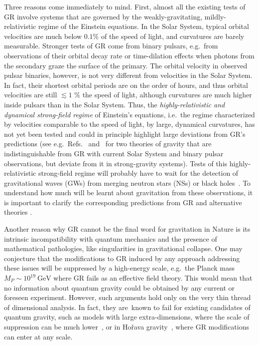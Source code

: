 \documentclass[prd,aps,twocolumn,nofootinbib,showpacs,superscriptaddress]{revtex4-1}
\begin{document}
Three reasons come immediately to mind. First, almost all the existing tests of GR involve systems that are governed by the
weakly-gravitating, mildly-relativistic regime of the Einstein
equations. In the Solar System, typical orbital velocities are much below $0.1\%$ of the speed of light, and curvatures
are barely measurable. Stronger tests of GR come from
binary pulsars, e.g.~from observations
of their orbital decay rate or time-dilation effects when photons from
the secondary graze the surface of the primary. The
orbital velocity in observed pulsar binaries, however, is not very different
from velocities in the Solar System. In fact, their shortest orbital periods
are on the order of hours, and thus orbital velocities are still $\lesssim 1$ \% the speed of light, 
although curvatures are much higher inside pulsars than in the Solar System. 
Thus, the {\textit{highly-relativistic and dynamical strong-field regime}} of Einstein's equations,
i.e.~the regime characterized by velocities comparable to
the speed of light, by large, dynamical curvatures,  
has not yet been tested and could in principle highlight large deviations 
from GR's predictions (see e.g.~Refs.~\cite{ST0,ST1,ST2,ST3} and~\cite{CSreview,Yagi:2011xp,Yagi:2012vf,Yagi:2013mbt} for two theories of gravity that are indistinguishable from GR with current Solar System and binary pulsar observations, but
deviate from it in strong-gravity systems).  Tests of this highly-relativistic strong-field regime will probably have to wait for the detection
of gravitational waves (GWs) from merging neutron stars (NSs) or black holes~\cite{ligo,virgo,Yunes:2013dva,ST1,ST2,ST3}. 
To understand how much will be learnt about gravitation from these observations, it is important to 
clarify the corresponding predictions from GR and alternative theories \cite{Yunes:2013dva}.

Another reason why GR cannot be the final word  for gravitation in Nature is 
its intrinsic incompatibility with quantum mechanics and the presence
of mathematical pathologies, like singularities in 
gravitational collapse. One may conjecture that the modifications to GR
induced by any approach addressing these issues will be suppressed by
a high-energy scale, e.g.~the Planck mass $M_P\sim 10^{19}\ \mathrm{GeV}$ 
where GR fails as an effective field theory. This would mean that no information about
quantum gravity could be obtained by any current or foreseen experiment.
 However, such arguments
hold only on the very thin thread of dimensional analysis. In fact, they are\
known to fail for existing candidates of quantum gravity, such as
models with large extra-dimensions, where the scale of suppression can
be much lower~\cite{Antoniadis:1998ig}, or in Ho\v rava
gravity~\cite{Horava:2009uw}, where GR modifications can enter at any
scale. 
\end{document}
